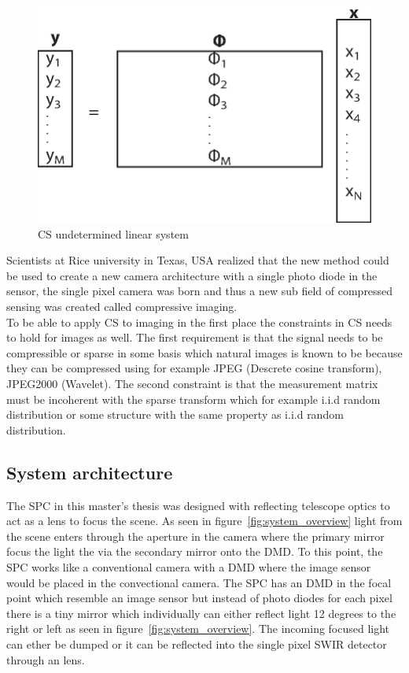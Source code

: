 \begin{figure}[H]
	\includegraphics[scale=0.5]{gfx/CS_eq.eps}
	\caption{CS undetermined linear system}
	\label{fig:CS_eq_sys}
\end{figure}



Scientists at Rice university in Texas, USA realized that the new method could be used to create a new camera architecture with a single photo diode in the sensor, the single pixel camera was born and thus a new sub field of compressed sensing was created called compressive imaging.\\[0.1in] 

To be able to apply CS to imaging in the first place the constraints in CS needs to hold for images as well. The first requirement is that the signal needs to be compressible or sparse in some basis which natural images is known to be because they can be compressed using for example JPEG (Descrete cosine transform), JPEG2000 (Wavelet). The second constraint is that the measurement matrix must be incoherent with the sparse transform which for example i.i.d random distribution or some structure with the same property as i.i.d random distribution.\\[0.1in]

\subsection{System architecture}
The SPC in this master's thesis was designed with reflecting telescope optics to act as a lens to focus the scene. As seen in figure~\ref{fig:system_overview} light from the scene enters through the aperture in the camera where the primary mirror focus the light the via the secondary mirror onto the DMD. To this point, the SPC works like a conventional camera with a DMD where the image sensor would be placed in the convectional camera. The SPC has an DMD in the focal point which resemble an image sensor but instead of photo diodes for each pixel there is a tiny mirror which individually can either reflect light 12 degrees to the right or left as seen in figure~\ref{fig:system_overview}. The incoming focused light can ether be dumped or it can be reflected into the single pixel SWIR detector through an lens. 

